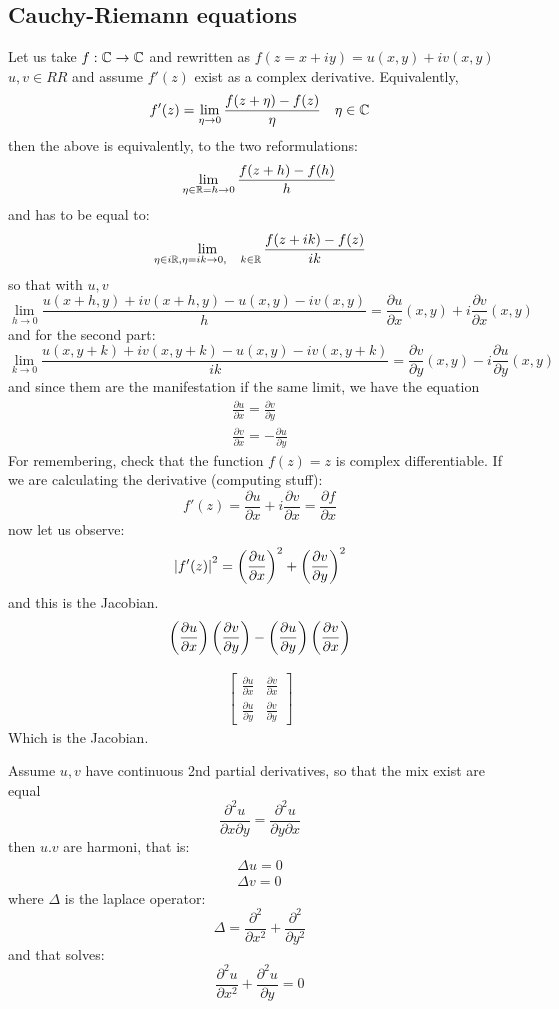 \subsection*{Cauchy-Riemann equations}
Let us take $ f : \mathbb{C} \rightarrow \mathbb{C} $ and rewritten as $ f(z= x + iy) = u(x,y) + i v(x,y) $ $ u,v \in RR$  and assume $f'(z)$ exist as a complex derivative. Equivalently,
\[ f'(z) = \lim\limits_{\eta \rightarrow 0}  \frac{f(z + \eta) - f(z)}{\eta} \quad \eta \in \mathbb{C}\]
then the above is equivalently, to the two reformulations:
\[ \lim_{\eta \in \mathbb{R} = h \rightarrow 0} \frac{f(z+h) - f(h)}{h} \]
and has to be equal to:
\[ \lim\limits_{\eta \in i\mathbb{R}, \eta = ik \rightarrow 0, \quad k \in \mathbb{R}}  \frac{f(z+ik) - f(z)}{ik}\]
so that with $u, v$
\[ \lim\limits_{h \rightarrow 0} \frac{u(x + h,y) + iv(x+h,y) - u(x,y)-iv(x,y)}{h} = \frac{\partial u}{\partial x}(x,y) + i \frac{\partial v}{\partial x} (x,y)\]
 and for the second part:
 \[ \lim\limits_{k \rightarrow 0 } \frac{u(x, y+k) + iv(x,y+k) - u(x,y) - iv(x,y+k)}{ik} = \frac{\partial v}{\partial y}(x,y) - i \frac{\partial u}{\partial y}(x,y)\]
 and since them are the manifestation if the same limit, we have the equation
 \begin{align*}
 \frac{ \partial u}{\partial x} = \frac{ \partial v}{\partial y} \\
 \frac{\partial v}{\partial x} = - \frac{ \partial u}{\partial y}
 \end{align*}
 For remembering, check that the function $ f(z) = z$ is complex differentiable. 
 If we are calculating the derivative (computing stuff):
 \[ f'(z) = \frac{\partial u}{\partial x} + i \frac{\partial v}{\partial x} = \frac{\partial f}{\partial x} \]
 now let us observe:
 \[ \left| f'(z) \right|^2 = \left( \frac{\partial u}{\partial x} \right)^2 + \left(  \frac{\partial v}{\partial y} \right)^2 \]
 and this is the Jacobian. 
 \[ \left( \frac{\partial u}{\partial x} \right) \left( \frac{\partial v}{\partial y} \right) - \left(  \frac{\partial u}{\partial y} \right) \left( \frac{\partial v}{\partial x} \right) \]
  
 \begin{align*}
 \begin{bmatrix}
 \frac{\partial u}{\partial x} & \frac{\partial v}{\partial x} \\
 \frac{\partial u}{\partial y} & \frac{\partial v}{\partial y}
 \end{bmatrix}
 \end{align*}
 Which is the Jacobian.
   
 Assume $u,v$ have continuous 2nd partial derivatives, so that the mix exist are equal 
 \[ \frac{ \partial^2 u}{\partial x \partial y} = \frac{\partial^2 u}{\partial y \partial x} \]
 then $u.v$ are harmoni, that is:
 \begin{align*}
 \Delta u = 0 \\
 \Delta v = 0
 \end{align*}
 where $\Delta$ is the laplace operator:
 \[ \Delta= \frac{\partial^2 }{\partial x^2} + \frac{\partial^2}{\partial y^2} \]
 and that solves:
 \[ \frac{\partial^2 u}{\partial x^2} + \frac{\partial^2 u}{\partial y} = 0 \]
 